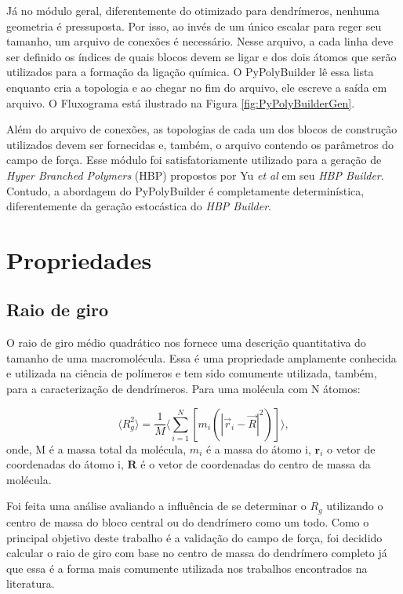 Já no módulo geral, diferentemente do otimizado para dendrímeros, nenhuma geometria é pressuposta.
Por isso, ao invés de um único escalar para reger seu tamanho, um arquivo de conexões é necessário.
Nesse arquivo, a cada linha deve ser definido os índices de quais blocos devem se ligar e dos dois átomos que serão utilizados para a formação da ligação química.
O PyPolyBuilder lê essa lista enquanto cria a topologia e ao chegar no fim do arquivo, ele escreve a saída em arquivo.
O Fluxograma está ilustrado na Figura \ref{fig:PyPolyBuilderGen}.

Além do arquivo de conexões, as topologias de cada um dos blocos de construção utilizados devem ser fornecidas e, também, o arquivo contendo os parâmetros do campo de força.
Esse módulo foi satisfatoriamente utilizado para a geração de \textit{Hyper Branched Polymers} (HBP) propostos por Yu \textit{et al}\cite{Yu2016} em seu \textit{HBP Builder}.
Contudo, a abordagem do PyPolyBuilder é completamente determinística, diferentemente da geração estocástica do \textit{HBP Builder}.

\section{Propriedades}\label{Propriedades}

\subsection{Raio de giro}\label{RaioDeGiro}
O raio de giro médio quadrático nos fornece uma descrição quantitativa do tamanho de uma macromolécula.
Essa é uma propriedade amplamente conhecida e utilizada na ciência de polímeros e tem sido comumente utilizada, também, para a caracterização de dendrímeros. 
Para uma molécula com N átomos:

\begin{equation}
\langle R_g^2 \rangle  = \frac{1}{M} \Bigg \langle\sum_{i=1}^{N} [{m_i}(|\vec{r}_i-\vec{R}|^2)] \Bigg \rangle,
\end{equation}
onde, M é a massa total da molécula, $m_i$ é a massa do átomo i, $\textbf{r}_i$ o vetor de coordenadas do átomo i, $\textbf{R}$ é o vetor de coordenadas do centro de massa da molécula.

Foi feita uma análise avaliando a influência de se determinar o $R_g$ utilizando o centro de massa do bloco central ou do dendrímero como um todo. Como o principal objetivo deste trabalho é a validação do campo de força, foi decidido calcular o raio de giro com base no centro de massa do dendrímero completo já que essa é a forma mais comumente utilizada nos trabalhos encontrados na literatura.

